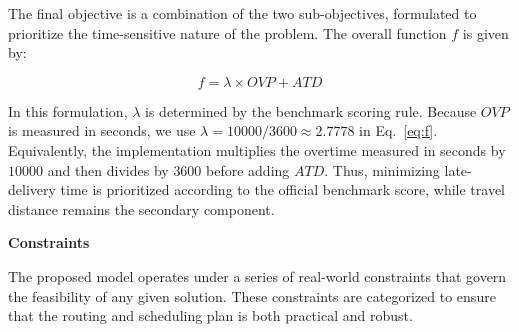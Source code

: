 \documentclass[pdflatex]{sn-jnl}
\begin{document}
The final objective is a combination of the two sub-objectives, formulated to prioritize the time-sensitive nature of the problem. The overall function $f$ is given by:

\begin{equation}\label{eq:f}
f = \lambda \times OVP + ATD    
\end{equation}

In this formulation, $\lambda$ is determined by the benchmark scoring rule. Because $OVP$ is measured in seconds, we use $\lambda=10000/3600\approx2.7778$ in Eq.~\eqref{eq:f}. Equivalently, the implementation multiplies the overtime measured in seconds by $10000$ and then divides by $3600$ before adding $ATD$. Thus, minimizing late-delivery time is prioritized according to the official benchmark score, while travel distance remains the secondary component.

\textbf{Constraints}

The proposed model operates under a series of real-world constraints that govern the feasibility of any given solution. These constraints are categorized to ensure that the routing and scheduling plan is both practical and robust.
\end{document}
